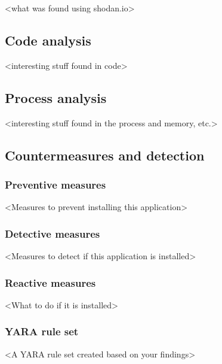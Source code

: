<what was found using shodan.io>

\newpage
\subsection{Code analysis}

<interesting stuff found in code>

\newpage
\subsection{Process analysis}

<interesting stuff found in the process and memory, etc.>

\newpage
\subsection{Countermeasures and detection}

\subsubsection{Preventive measures}


<Measures to prevent installing this application>

\subsubsection{Detective measures}

<Measures to detect if this application is installed>

\subsubsection{Reactive measures}

<What to do if it is installed>

\subsubsection{YARA rule set}

<A YARA rule set created based on your findings>
